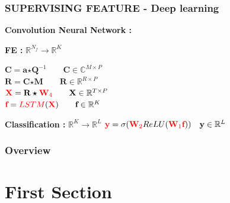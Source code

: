 \documentclass{beamer}
\begin{document}
\begin{frame}
\frametitle{SUPERVISING FEATURE - Deep learning}
\textbf{Convolution Neural Network :}
\begin{block}{\textbf{FE :} $\mathbb{R}^{N_{f}} \rightarrow \mathbb{R}^{K}$}

$\textbf{C} = \textbf{a} \bm{\star} \textbf{Q}^{-1} \qquad \textbf{C} \in \mathbb{C}^{M \times P}$\\
$\textbf{R} = \textbf{C} \bm{\star} \textbf{M} \qquad \textbf{R} \in \mathbb{R}^{R \times P}$\\
${\color{red}\textbf{X}} = \textbf{R} \bm{\star} {\color{red}\textbf{W}_{4}} \qquad \textbf{X} \in \mathbb{R}^{T \times P}$\\
${\color{red}\textbf{f}} = {\color{red}LSTM}({\color{red}\textbf{X}}) \qquad \textbf{f} \in \mathbb{R}^{K}$\\
\end{block}

\begin{block}{\textbf{Classification :} $\mathbb{R}^{K} \rightarrow \mathbb{R}^{L}$}
${\color{red}\textbf{y}} = \sigma({\color{red}\textbf{W}_{2}}ReLU({\color{red}\textbf{W}_{1}}{\color{red}\textbf{f}})) \quad \textbf{y} \in \mathbb{R}^{L}$
\end{block}
\end{frame}

\begin{frame}
\frametitle{Overview} %
\tableofcontents %
\end{frame}


\section{First Section} %
\end{document}
